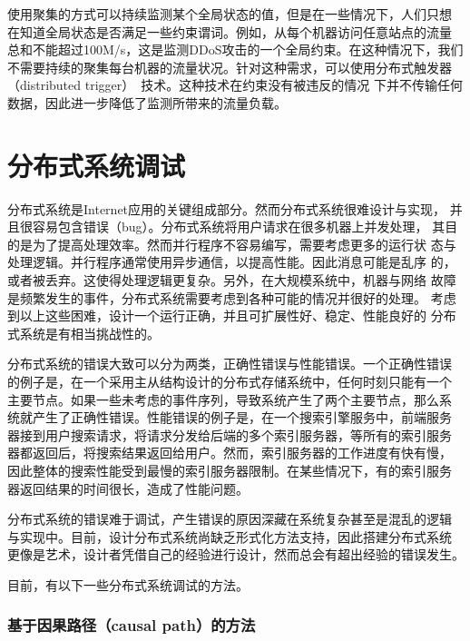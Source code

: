 使用聚集的方式可以持续监测某个全局状态的值，但是在一些情况下，人们只想
在知道全局状态是否满足一些约束谓词。例如，从每个机器访问任意站点的流量
总和不能超过100M/s，这是监测DDoS攻击的一个全局约束。在这种情况下，我们
不需要持续的聚集每台机器的流量状况。针对这种需求，可以使用分布式触发器
（distributed trigger）~\cite{xxx}技术。这种技术在约束没有被违反的情况
下并不传输任何数据，因此进一步降低了监测所带来的流量负载。

\section{分布式系统调试}
\label{sec:intro_debugging}

分布式系统是Internet应用的关键组成部分。然而分布式系统很难设计与实现，
并且很容易包含错误（bug）。分布式系统将用户请求在很多机器上并发处理，
其目的是为了提高处理效率。然而并行程序不容易编写，需要考虑更多的运行状
态与处理逻辑。并行程序通常使用异步通信，以提高性能。因此消息可能是乱序
的，或者被丢弃。这使得处理逻辑更复杂。另外，在大规模系统中，机器与网络
故障是频繁发生的事件，分布式系统需要考虑到各种可能的情况并很好的处理。
考虑到以上这些困难，设计一个运行正确，并且可扩展性好、稳定、性能良好的
分布式系统是有相当挑战性的。

分布式系统的错误大致可以分为两类，正确性错误与性能错误。一个正确性错误
的例子是，在一个采用主从结构设计的分布式存储系统中，任何时刻只能有一个
主要节点。如果一些未考虑的事件序列，导致系统产生了两个主要节点，那么系
统就产生了正确性错误。性能错误的例子是，在一个搜索引擎服务中，前端服务
器接到用户搜索请求，将请求分发给后端的多个索引服务器，等所有的索引服务
器都返回后，将搜索结果返回给用户。然而，索引服务器的工作进度有快有慢，
因此整体的搜索性能受到最慢的索引服务器限制。在某些情况下，有的索引服务
器返回结果的时间很长，造成了性能问题。

分布式系统的错误难于调试，产生错误的原因深藏在系统复杂甚至是混乱的逻辑
与实现中。目前，设计分布式系统尚缺乏形式化方法支持，因此搭建分布式系统
更像是艺术，设计者凭借自己的经验进行设计，然而总会有超出经验的错误发生。


目前，有以下一些分布式系统调试的方法。

\subsubsection*{基于因果路径（causal path）的方法}


